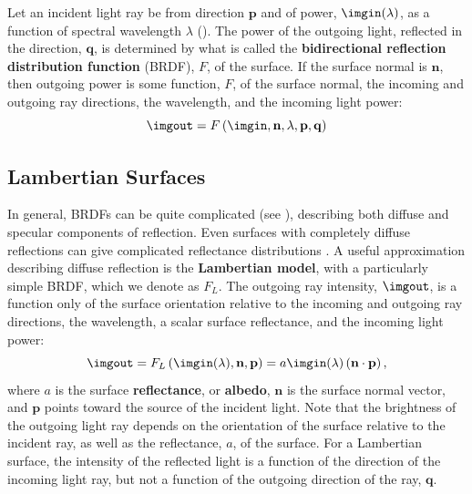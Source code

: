 Let an incident light ray be from direction $\mathbf{p}$ and
of power, $\imgin(\lambda)$, as a function of spectral wavelength $\lambda$ (\fig{\ref{fig:lightSpray}}).  The
power of the outgoing light, reflected in the direction, $\mathbf{q}$, is determined by what is called the {\bf bidirectional
reflection distribution function} (BRDF), $F$, of the surface. If the
surface normal is $\mathbf{n}$, then  outgoing power is some function, $F$, of the surface normal, the incoming and outgoing ray directions, the wavelength, and the incoming light power:
\begin{equation}
\imgout = F \left( \imgin, \mathbf{n}, \lambda, \mathbf{p}, \mathbf{q} \right)
\label{eq:Lambert}
\end{equation}

\subsection{Lambertian Surfaces}

In general, BRDFs can be quite complicated (see \cite{Matusik2002}), describing both diffuse and specular components of reflection.  Even surfaces with completely diffuse reflections can give complicated reflectance distributions \cite{Oren1994}.  
A useful approximation describing diffuse reflection is the {\bf Lambertian model}, with a particularly simple BRDF, which we denote as $F_L$.  The outgoing ray intensity, $\imgout$, is a function only of the surface orientation relative to the incoming and outgoing ray directions, the wavelength, a scalar surface reflectance, and the incoming light power:
\begin{equation}
\imgout = F_{L} \left( \imgin (\lambda), \mathbf{n}, \mathbf{p} \right)  = a \imgin(\lambda) \left( \mathbf{n} \cdot \mathbf{p} \right),
\label{eq:lambert}
\end{equation}
where $a$ is the surface {\bf reflectance}, or {\bf albedo}, $\mathbf{n}$ is the
surface normal vector, and $\mathbf{p}$ points toward the source of the incident
light.  Note that the brightness of the outgoing light ray depends on
the orientation of the surface relative to the incident ray, as well
as the reflectance, $a$, of the surface.  For a Lambertian surface,
the intensity of the reflected light is a function of the direction of
the incoming light ray, but not a function of the outgoing direction
of the ray, $\mathbf{q}$.  

